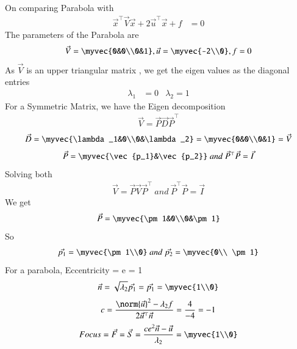 \documentclass[journal]{IEEEtran}
\begin{document}
On comparing Parabola  with
\begin{align}
\vec{x}^\top\vec{V}\vec{x} + 2\vec{u}^\top\vec{x} + f &= 0 \label{eq: conic}
\end{align}
The parameters of the Parabola are 
\begin{align}
\vec{V}=\myvec{0&0\\0&1} , \vec{u}=\myvec{-2\\0} , f=0
\end{align}
As $\vec{V}$ is an upper triangular matrix , we get the eigen values as the diagonal entries 
\begin{align}
  \lambda_1 &= 0 & \lambda_2 = 1
\end{align}
For a Symmetric Matrix, we have the Eigen decomposition
\begin{align}
\vec{V} = \vec{P}\vec{D}\vec{P}^\top
\end{align}
\begin{align}
\vec{D} = \myvec{\lambda_1&0\\0&\lambda_2} = \myvec{0&0\\0&1} = \vec{V}
\end{align}
\begin{align}
\vec{P} = \myvec{\vec{p_1}&\vec{p_2}} \ and \ \vec{P}^\top\vec{P} = \vec{I} 
\end{align}
Solving both 
\begin{align}
\vec{V} = \vec{P}\vec{V}\vec{P}^\top \ and \ \vec{P}^\top\vec{P} = \vec{I}
\end{align}
We get
\begin{align}
\vec{P} = \myvec{\pm1&0\\0&\pm1}
\end{align}
So
\begin{align}
\vec{p_1} = \myvec{\pm1\\0} \ and \ \vec{p_2} = \myvec{0\\ \pm1}
\end{align}
For a parabola, Eccentricity = e = 1
\begin{align}
\vec{n} = \sqrt{\lambda_2}\vec{p_1} = \vec{p_1} = \myvec{1\\0}
\end{align}
\begin{align}
c = \frac{{\norm{\vec{u}}}^2 - \lambda_2 f}{2\vec{u}^\top\vec{n}} = \frac{4}{-4} = -1
\end{align}
\begin{align}
Focus = \vec{F} = \vec{S} = \frac{ce^2\vec{n} - \vec{u}}{\lambda_2} = \myvec{1\\0}
\end{align}
\end{document}
